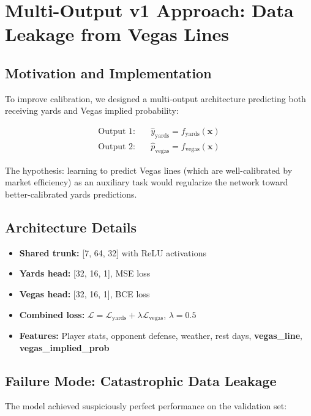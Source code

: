 \section{Multi-Output v1 Approach: Data Leakage from Vegas Lines}

\subsection{Motivation and Implementation}

To improve calibration, we designed a multi-output architecture predicting both receiving yards and Vegas implied probability:

\begin{align}
\text{Output 1:} \quad &\hat{y}_{\text{yards}} = f_{\text{yards}}(\mathbf{x}) \\
\text{Output 2:} \quad &\hat{p}_{\text{vegas}} = f_{\text{vegas}}(\mathbf{x})
\end{align}

The hypothesis: learning to predict Vegas lines (which are well-calibrated by market efficiency) as an auxiliary task would regularize the network toward better-calibrated yards predictions.

\subsection{Architecture Details}

\begin{itemize}
  \item \textbf{Shared trunk:} [7, 64, 32] with ReLU activations
  \item \textbf{Yards head:} [32, 16, 1], MSE loss
  \item \textbf{Vegas head:} [32, 16, 1], BCE loss
  \item \textbf{Combined loss:} $\mathcal{L} = \mathcal{L}_{\text{yards}} + \lambda \mathcal{L}_{\text{vegas}}$, $\lambda=0.5$
  \item \textbf{Features:} Player stats, opponent defense, weather, rest days, \textbf{vegas\_line}, \textbf{vegas\_implied\_prob}
\end{itemize}

\subsection{Failure Mode: Catastrophic Data Leakage}

The model achieved suspiciously perfect performance on the validation set:

